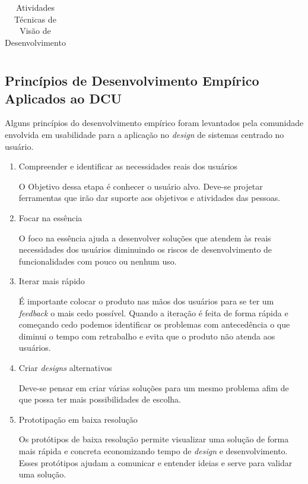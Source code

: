 \begin{itemize}
\begin{table}[h]
\begin{tabular}{|l|l|l|l|l|}
\end{tabular}
\caption{Atividades Técnicas de Visão de Desenvolvimento}
\end{table}

\end{itemize}

\newpage

\subsection{Princípios de Desenvolvimento Empírico Aplicados ao DCU}

	Alguns princípios do desenvolvimento empírico foram levantados pela comunidade envolvida em usabilidade para a aplicação no \emph{design} de sistemas centrado no usuário.

\begin{enumerate}

\item Compreender e identificar as necessidades reais dos usuários

O Objetivo dessa etapa é conhecer o usuário alvo. Deve-se projetar ferramentas que irão dar suporte aos objetivos e atividades das pessoas.

\item Focar na essência

O foco na essência ajuda a desenvolver soluções que atendem às reais necessidades dos usuários diminuindo os riscos de desenvolvimento de funcionalidades com pouco ou nenhum uso.


\item Iterar mais rápido

	É importante colocar o produto nas mãos dos usuários para se ter um \textit{feedback} o mais cedo possível. Quando a iteração é feita de forma rápida e começando cedo podemos identificar os problemas com antecedência o que diminui o tempo com retrabalho e evita que o produto não atenda aos usuários.
	

\item Criar \emph{designs} alternativos

	Deve-se pensar em criar várias soluções para um mesmo problema afim de que possa ter mais possibilidades de escolha. 


\item Prototipação em baixa resolução

Os protótipos de baixa resolução permite visualizar uma solução de forma mais rápida e concreta economizando tempo de \emph{design} e desenvolvimento. Esses protótipos ajudam a comunicar e entender ideias e serve para validar uma solução. 


\end{enumerate}
